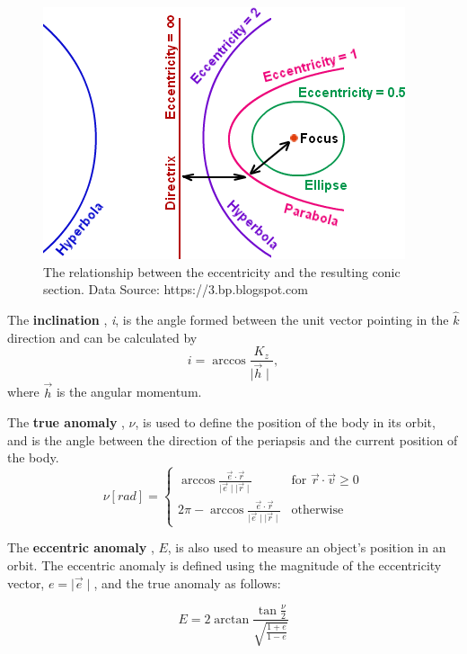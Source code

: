 \documentclass[a4paper, 12pt]{article}
\newcommand{\lindex}[1]{%
	\lowercase{\def\temp{#1}}%
	\expandafter\index\expandafter{\temp}%
}
\newcommand{\boldindex}[1]{%
	\textbf{#1}\lindex{#1}%
}
\begin{document}
\begin{figure}[h]
	\centering
	\includegraphics[scale=0.45]{eccentricity}
	\caption{The relationship between the eccentricity and the resulting conic section. Data Source: https://3.bp.blogspot.com}
\end{figure}

The \boldindex{inclination}, \textit{i}, is the angle formed between the unit vector pointing in the $\hat{k}$ direction and can be calculated by
\begin{equation}
\textit{i} =  \arccos \frac{K_z}{\mid \vec{h} \mid},
\end{equation}
where $\vec{h}$ is the angular momentum.

The \boldindex{true anomaly}, $\nu$, is used to define the position of the body in its orbit, and is the angle between the direction of the periapsis and the current position of the body.
\begin{equation}
	\nu [rad] = \begin{cases}
		\arccos \frac{\vec{e} \cdot \vec{r}}{\mid \vec{e} \mid \mid \vec{r} \mid} & \text{for } \vec{r} \cdot \vec{v} \geq 0 \\
		2\pi - \arccos \frac{\vec{e} \cdot \vec{r}}{\mid \vec{e} \mid \mid \vec{r} \mid}& \text{otherwise}	
	\end{cases}
\end{equation}


 The \boldindex{eccentric anomaly}, $E$, is also used to measure an object's position in an orbit. The eccentric anomaly is defined using the magnitude of the eccentricity vector, $e = \mid\vec{e}\mid$, and  the true anomaly as follows:

\begin{equation}
	E = 2\arctan \frac{\tan \frac{\nu}{2}}{\sqrt{\frac{1 + e}{1-e}}}
\end{equation}
\end{document}
